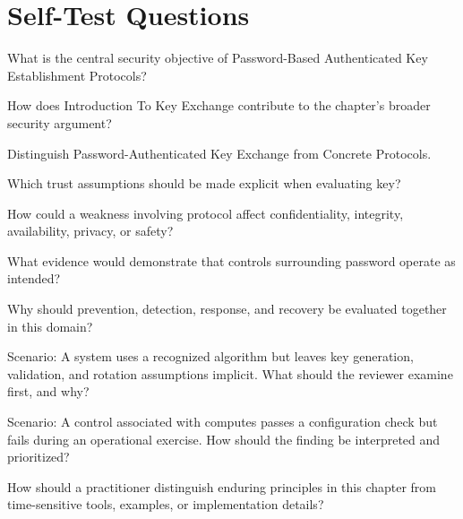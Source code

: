 \documentclass[11pt,letterpaper]{article}
\begin{document}
\section*{Self-Test Questions}
\begin{CornellRecallList}
\item What is the central security objective of Password-Based Authenticated Key Establishment Protocols?
\item How does Introduction To Key Exchange contribute to the chapter's broader security argument?
\item Distinguish Password-Authenticated Key Exchange from Concrete Protocols.
\item Which trust assumptions should be made explicit when evaluating key?
\item How could a weakness involving protocol affect confidentiality, integrity, availability, privacy, or safety?
\item What evidence would demonstrate that controls surrounding password operate as intended?
\item Why should prevention, detection, response, and recovery be evaluated together in this domain?
\item Scenario: A system uses a recognized algorithm but leaves key generation, validation, and rotation assumptions implicit. What should the reviewer examine first, and why?
\item Scenario: A control associated with computes passes a configuration check but fails during an operational exercise. How should the finding be interpreted and prioritized?
\item How should a practitioner distinguish enduring principles in this chapter from time-sensitive tools, examples, or implementation details?
\end{CornellRecallList}
\end{document}
